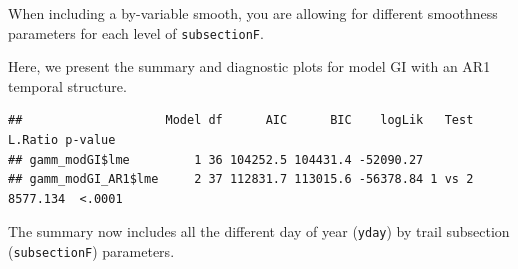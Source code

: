 \documentclass[
]{book}
\begin{document}
When including a by-variable smooth, you are allowing for different smoothness parameters for each level of \texttt{subsectionF}.

Here, we present the summary and diagnostic plots for model GI with an AR1 temporal structure.

\begin{verbatim}
##                    Model df      AIC      BIC    logLik   Test  L.Ratio p-value
## gamm_modGI$lme         1 36 104252.5 104431.4 -52090.27                        
## gamm_modGI_AR1$lme     2 37 112831.7 113015.6 -56378.84 1 vs 2 8577.134  <.0001
\end{verbatim}

The summary now includes all the different day of year (\texttt{yday}) by trail subsection (\texttt{subsectionF}) parameters.
\end{document}

